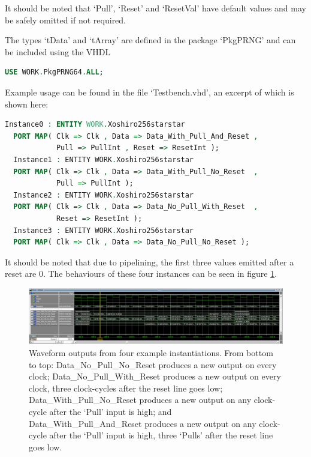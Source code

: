 \documentclass{article}
\begin{document}
It should be noted that `Pull', `Reset' and `ResetVal' have default values and may be safely omitted if not required.

The types `tData' and `tArray' are defined in the package `PkgPRNG' and can be included using the VHDL

\begin{minipage}{1.0\textwidth}
\centering
\begin{lstlisting}[language=VHDL, label=lst:PkgPRNG]
USE WORK.PkgPRNG64.ALL;
\end{lstlisting}
\end{minipage}

Example usage can be found in the file `Testbench.vhd', an excerpt of which is shown here:

\begin{minipage}{1.0\textwidth}
\centering
\begin{lstlisting}[language=VHDL, label=lst:Xoshiro256starstar_instance]
  Instance0 : ENTITY WORK.Xoshiro256starstar 
  PORT MAP( Clk => Clk , Data => Data_With_Pull_And_Reset , 
            Pull => PullInt , Reset => ResetInt );
  Instance1 : ENTITY WORK.Xoshiro256starstar 
  PORT MAP( Clk => Clk , Data => Data_With_Pull_No_Reset  , 
            Pull => PullInt );
  Instance2 : ENTITY WORK.Xoshiro256starstar 
  PORT MAP( Clk => Clk , Data => Data_No_Pull_With_Reset  ,                  
            Reset => ResetInt );
  Instance3 : ENTITY WORK.Xoshiro256starstar 
  PORT MAP( Clk => Clk , Data => Data_No_Pull_No_Reset );
\end{lstlisting}
\end{minipage}

It should be noted that due to pipelining, the first three values emitted after a reset are 0. The behaviours of these four instances can be seen in figure \ref{fig:Modelsim_GUI_output}.

\begin{figure}[ht]
\centering
\includegraphics[width=\textwidth]{ModelsimGui.png}
\caption{Waveform outputs from four example instantiations. From bottom to top: Data\_No\_Pull\_No\_Reset produces a new output on every clock; Data\_No\_Pull\_With\_Reset produces a new output on every clock, three clock-cycles after the reset line goes low; Data\_With\_Pull\_No\_Reset produces a new output on any clock-cycle after the `Pull' input is high; and Data\_With\_Pull\_And\_Reset produces a new output on any clock-cycle after the `Pull' input is high, three `Pulls' after the reset line goes low.}
\label{fig:Modelsim_GUI_output}
\end{figure}
\end{document}
